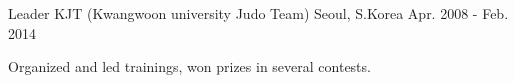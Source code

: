 \begin{cventries}
  \cventry
    {Leader} %
    {KJT (Kwangwoon university Judo Team)} %
    {Seoul, S.Korea} %
    {Apr. 2008 - Feb. 2014} %
    {
      \begin{cvitems} %
        \item {Organized and led trainings, won prizes in several contests.}
      \end{cvitems}
    }

\end{cventries}
